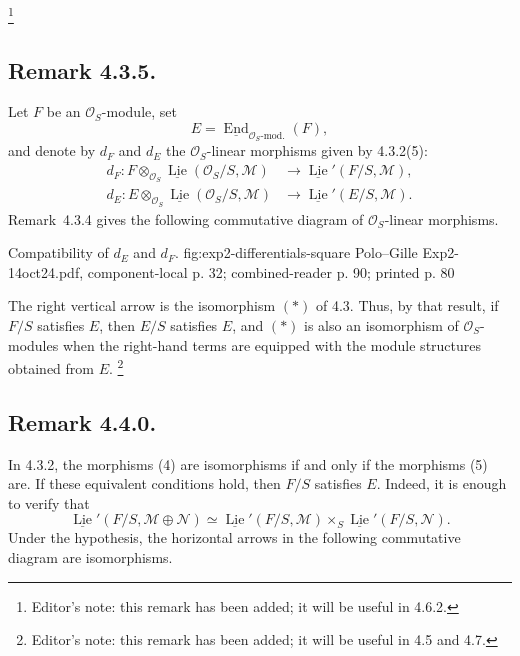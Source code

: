 \footnote{Editor's note: this remark has been added; it will be useful in
4.6.2.}

\subsection*{Remark 4.3.5.}
Let \(F\) be an \(\mathcal O_S\)-module, set
\[
 E=\underline{\operatorname{End}}_{\mathcal O_S\text{-mod.}}(F),
\]
and denote by \(d_F\) and \(d_E\) the \(\mathcal O_S\)-linear morphisms
given by 4.3.2(5):
\[
\begin{aligned}
 d_F:
 F\otimes_{\mathcal O_S}
 \underline{\operatorname{Lie}}(\mathcal O_S/S,\mathcal M)
 &\longrightarrow
 \underline{\operatorname{Lie}}'(F/S,\mathcal M),\\
 d_E:
 E\otimes_{\mathcal O_S}
 \underline{\operatorname{Lie}}(\mathcal O_S/S,\mathcal M)
 &\longrightarrow
 \underline{\operatorname{Lie}}'(E/S,\mathcal M).
\end{aligned}
\]
Remark~4.3.4 gives the following commutative diagram of
\(\mathcal O_S\)-linear morphisms.

  {Compatibility of \(d_E\) and \(d_F\).}
  {fig:exp2-differentials-square}
  {Polo--Gille Exp2-14oct24.pdf, component-local p. 32; combined-reader p. 90; printed p. 80}

The right vertical arrow is the isomorphism \((*)\) of 4.3. Thus, by
that result, if \(F/S\) satisfies \(E\), then \(E/S\) satisfies \(E\), and
\((*)\) is also an isomorphism of \(\mathcal O_S\)-modules when the
right-hand terms are equipped with the module structures obtained from
\(E\).
\footnote{Editor's note: this remark has been added; it will be useful in
4.5 and 4.7.}

\subsection*{Remark 4.4.0.}
In 4.3.2, the morphisms (4) are isomorphisms if and only if the
morphisms (5) are. If these equivalent conditions hold, then \(F/S\)
satisfies \(E\). Indeed, it is enough to verify that
\[
 \underline{\operatorname{Lie}}'(F/S,\mathcal M\oplus\mathcal N)
 \simeq
 \underline{\operatorname{Lie}}'(F/S,\mathcal M)
 \times_S
 \underline{\operatorname{Lie}}'(F/S,\mathcal N).
\]
Under the hypothesis, the horizontal arrows in the following commutative
diagram are isomorphisms.

